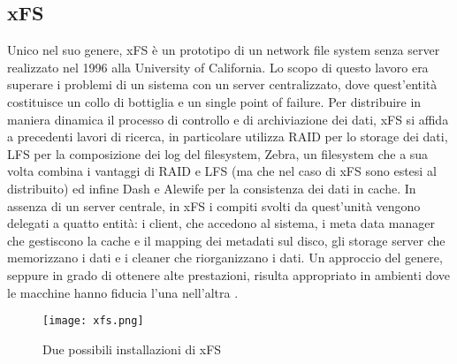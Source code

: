 \subsection{xFS}
Unico nel suo genere, xFS è un prototipo di un network file system senza server realizzato nel 1996 alla University of California. Lo scopo di questo lavoro era superare i problemi di un sistema con un server centralizzato, dove quest'entità costituisce un collo di bottiglia e un single point of failure. Per distribuire in maniera dinamica il processo di controllo e di archiviazione dei dati, xFS si affida a precedenti lavori di ricerca, in particolare utilizza RAID per lo storage dei dati, LFS per la composizione dei log del filesystem, Zebra, un filesystem che a sua volta combina i vantaggi di RAID e LFS (ma che nel caso di xFS sono estesi al distribuito) ed infine Dash e Alewife per la consistenza dei dati in cache. In assenza di un server centrale, in xFS i compiti svolti da quest'unità vengono delegati a quatto entità: i client, che accedono al sistema, i meta data manager che gestiscono la cache e il mapping dei metadati sul disco, gli storage server che memorizzano i dati e i cleaner che riorganizzano i dati. Un approccio del genere, seppure in grado di ottenere alte prestazioni, risulta appropriato in ambienti dove le macchine hanno fiducia l'una nell'altra \cite{anderson96}.
\begin{figure}[H]
  \begin{center}
    \texttt{[image: xfs.png]}
    \caption{Due possibili installazioni di xFS}
    \label{fg:xfs.jpg}
  \end{center}
\end{figure}
